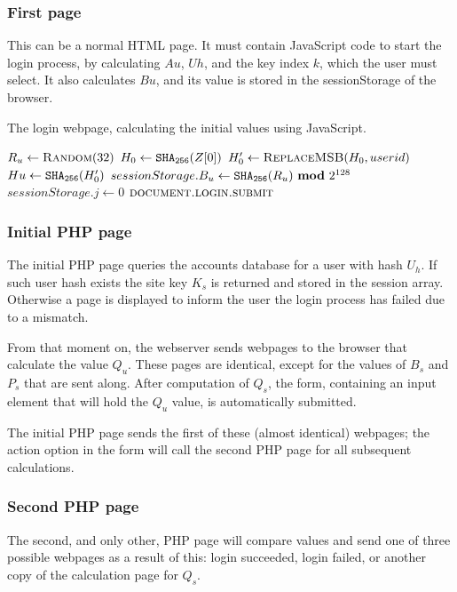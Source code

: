 \subsubsection{First page}
This can be a normal HTML page.
It must contain JavaScript code to start the login process,
by calculating $Au$, $Uh$, and the key index $k$, which the user must select.
It also calculates $Bu$, and its value is stored in the sessionStorage of the browser.
\begin{algorithm}[H]
\caption{The login webpage, calculating the initial values using JavaScript.}
\label{html:login}
\begin{algorithmic}[1]
\State $R_u\gets\Call{Random}{32}$
\State $H_0\gets\texttt{\ensuremath{\mathtt{SHA_{256}}}}(Z[0])$
\State $H_0'\gets\Call{ReplaceMSB}{H_0,userid}$
\State $Hu\gets\texttt{\ensuremath{\mathtt{SHA_{256}}}}(H_0')$
\State $sessionStorage.B_u\gets\texttt{\ensuremath{\mathtt{SHA_{256}}}}(R_u)\ \textbf{mod}\ 2^{128}$
\State $sessionStorage.j\gets 0$
\State $\Call{document.login.submit}{}$
\EndProcedure
\end{algorithmic}
\end{algorithm}
\subsubsection{Initial PHP page}
The initial PHP page queries the accounts database for a user with hash $U_h$.
If such user hash exists the site key $K_s$ is returned and stored in the session array.
Otherwise a page is displayed to inform the user the login process has failed due to a mismatch.
\par
From that moment on,
the webserver sends webpages to the browser that calculate the value $Q_u$.
These pages are identical, except for the values of $B_s$ and $P_s$ that are sent along.
After computation of $Q_s$, the form,
containing an input element that will hold the $Q_u$ value,
is automatically submitted.
\par
The initial PHP page sends the first of these
(almost identical)
webpages;
the action option in the form will call the second PHP page for all subsequent calculations.
\subsubsection{Second PHP page}
The second,
and only other,
PHP page will compare values and send one of three possible webpages as a result of this:
login succeeded,
login failed,
or another copy of the calculation page for $Q_s$.
